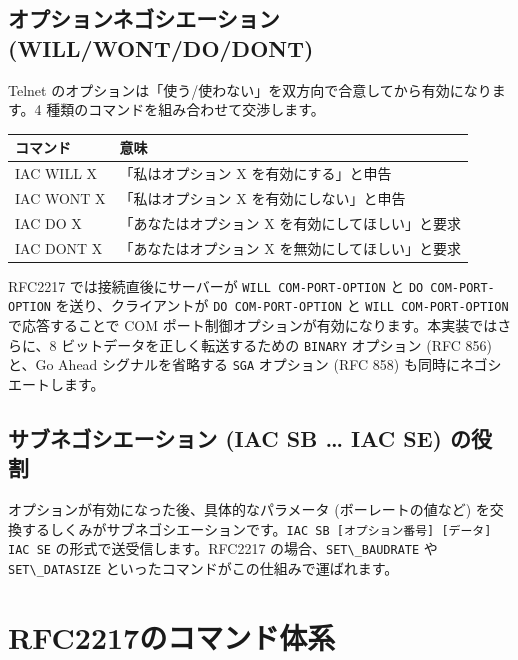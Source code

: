 \documentclass[10pt,twoside,openany,a4j]{ltjsbook}
\newcommand{\passthrough}[1]{#1}
\begin{document}
\subsection{オプションネゴシエーション
(WILL/WONT/DO/DONT)}\label{ux30aaux30d7ux30b7ux30e7ux30f3ux30cdux30b4ux30b7ux30a8ux30fcux30b7ux30e7ux30f3-willwontdodont}

Telnet
のオプションは「使う/使わない」を双方向で合意してから有効になります。4
種類のコマンドを組み合わせて交渉します。

\begin{longtable}[]{@{}ll@{}}
\toprule\noalign{}
コマンド & 意味 \\
\midrule\noalign{}
\endhead
\bottomrule\noalign{}
\endlastfoot
IAC WILL X & 「私はオプション X を有効にする」と申告 \\
IAC WONT X & 「私はオプション X を有効にしない」と申告 \\
IAC DO X & 「あなたはオプション X を有効にしてほしい」と要求 \\
IAC DONT X & 「あなたはオプション X を無効にしてほしい」と要求 \\
\end{longtable}

RFC2217 では接続直後にサーバーが
\passthrough{\lstinline!WILL COM-PORT-OPTION!} と
\passthrough{\lstinline!DO COM-PORT-OPTION!} を送り、クライアントが
\passthrough{\lstinline!DO COM-PORT-OPTION!} と
\passthrough{\lstinline!WILL COM-PORT-OPTION!} で応答することで COM
ポート制御オプションが有効になります。本実装ではさらに、8
ビットデータを正しく転送するための \passthrough{\lstinline!BINARY!}
オプション (RFC 856) と、Go Ahead シグナルを省略する
\passthrough{\lstinline!SGA!} オプション (RFC 858)
も同時にネゴシエートします。

\subsection{サブネゴシエーション (IAC SB \ldots{} IAC SE)
の役割}\label{ux30b5ux30d6ux30cdux30b4ux30b7ux30a8ux30fcux30b7ux30e7ux30f3-iac-sb-iac-se-ux306eux5f79ux5272}

オプションが有効になった後、具体的なパラメータ (ボーレートの値など)
を交換するしくみがサブネゴシエーションです。\passthrough{\lstinline!IAC SB [オプション番号] [データ] IAC SE!}
の形式で送受信します。RFC2217
の場合、\passthrough{\lstinline!SET\_BAUDRATE!} や
\passthrough{\lstinline!SET\_DATASIZE!}
といったコマンドがこの仕組みで運ばれます。

\section{RFC2217のコマンド体系}\label{rfc2217ux306eux30b3ux30deux30f3ux30c9ux4f53ux7cfb}
\end{document}
